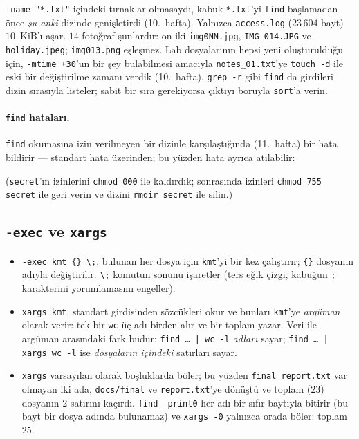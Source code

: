 \documentclass[11pt,a4paper]{article}
\newcommand{\cmd}[1]{\texttt{#1}}
\begin{document}
\cmd{-name "*.txt"} içindeki tırnaklar olmasaydı, kabuk \texttt{*.txt}'yi \cmd{find} başlamadan önce \emph{şu anki} dizinde genişletirdi (10.~hafta). Yalnızca \texttt{access.log} ($23\,604$ bayt) $10$~KiB'ı aşar. $14$ fotoğraf şunlardır: on iki \texttt{img0NN.jpg}, \texttt{IMG\_014.JPG} ve \texttt{holiday.jpeg}; \texttt{img013.png} eşleşmez. Lab dosyalarının hepsi yeni oluşturulduğu için, \cmd{-mtime +30}'un bir şey bulabilmesi amacıyla \texttt{notes\_01.txt}'ye \cmd{touch -d} ile eski bir değiştirilme zamanı verdik (10.~hafta). \cmd{grep -r} gibi \cmd{find} da girdileri dizin sırasıyla listeler; sabit bir sıra gerekiyorsa çıktıyı boruyla \cmd{sort}'a verin.

\paragraph{\texttt{find} hataları.} \cmd{find} okumasına izin verilmeyen bir dizinle karşılaştığında (11.~hafta) bir hata bildirir --- standart hata üzerinden; bu yüzden hata ayrıca atılabilir:

(\texttt{secret}'ın izinlerini \cmd{chmod 000} ile kaldırdık; sonrasında izinleri \cmd{chmod 755 secret} ile geri verin ve dizini \cmd{rmdir secret} ile silin.)

\subsection{\texttt{-exec} ve \texttt{xargs}}



\begin{itemize}
  \item \cmd{-exec kmt \{\} \textbackslash;}, bulunan her dosya için \cmd{kmt}'yi bir kez çalıştırır; \texttt{\{\}} dosyanın adıyla değiştirilir. \texttt{\textbackslash;} komutun sonunu işaretler (ters eğik çizgi, kabuğun \texttt{;} karakterini yorumlamasını engeller).
  \item \cmd{xargs kmt}, standart girdisinden sözcükleri okur ve bunları \cmd{kmt}'ye \emph{argüman} olarak verir: tek bir \cmd{wc} üç adı birden alır ve bir toplam yazar. Veri ile argüman arasındaki fark budur: \cmd{find \dots{} | wc -l} \emph{adları} sayar; \cmd{find \dots{} | xargs wc -l} ise \emph{dosyaların içindeki} satırları sayar.
  \item \cmd{xargs} varsayılan olarak boşluklarda böler; bu yüzden \texttt{final report.txt} var olmayan iki ada, \texttt{docs/\allowbreak final} ve \texttt{report.txt}'ye dönüştü ve toplam ($23$) dosyanın $2$ satırını kaçırdı. \cmd{find -print0} her adı bir sıfır baytıyla bitirir (bu bayt bir dosya adında bulunamaz) ve \cmd{xargs -0} yalnızca orada böler: toplam $25$.
\end{itemize}
\end{document}
